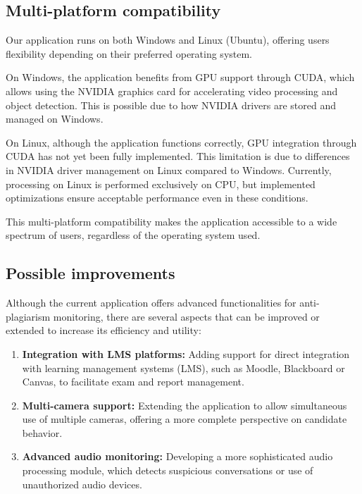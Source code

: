 \documentclass[12pt,a4paper]{article}
\begin{document}
\subsection{Multi-platform compatibility}
Our application runs on both Windows and Linux (Ubuntu), offering users flexibility depending on their preferred operating system. 

On Windows, the application benefits from GPU support through CUDA, which allows using the NVIDIA graphics card for accelerating video processing and object detection. This is possible due to how NVIDIA drivers are stored and managed on Windows.

On Linux, although the application functions correctly, GPU integration through CUDA has not yet been fully implemented. This limitation is due to differences in NVIDIA driver management on Linux compared to Windows. Currently, processing on Linux is performed exclusively on CPU, but implemented optimizations ensure acceptable performance even in these conditions.

This multi-platform compatibility makes the application accessible to a wide spectrum of users, regardless of the operating system used.

\subsection{Possible improvements}

Although the current application offers advanced functionalities for anti-plagiarism monitoring, there are several aspects that can be improved or extended to increase its efficiency and utility:

\begin{enumerate}
    \item \textbf{Integration with LMS platforms:} Adding support for direct integration with learning management systems (LMS), such as Moodle, Blackboard or Canvas, to facilitate exam and report management.

    \item \textbf{Multi-camera support:} Extending the application to allow simultaneous use of multiple cameras, offering a more complete perspective on candidate behavior.

    \item \textbf{Advanced audio monitoring:} Developing a more sophisticated audio processing module, which detects suspicious conversations or use of unauthorized audio devices.

\end{enumerate}
\end{document}
